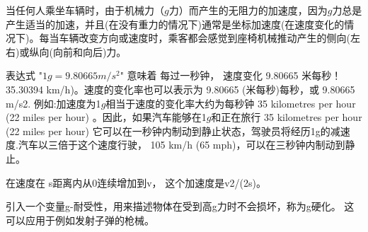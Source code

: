 当任何人乘坐车辆时，由于机械力（$g$力）而产生的无阻力的加速度，因为$g$力总是产生适当的加速，并且(在没有重力的情况下)通常是坐标加速度(在速度变化的情况下)。每当车辆改变方向或速度时，乘客都会感觉到座椅机械推动产生的侧向(左右)或纵向(向前和向后)力。

表达式 "$1 g = 9.80665 m/s^2$" 意味着 每过一秒钟， 速度变化 9.80665 米每秒！35.30394 km/h)。速度的变化率也可以表示为 9.80665 (米每秒)每秒，或 9.80665 m/s2. 例如:加速度为1$g$相当于速度的变化率大约为每秒钟 35 kilometres per hour (22 miles per hour) 。因此，如果汽车能够在1$g$和正在旅行 35 kilometres per hour (22 miles per hour) 它可以在一秒钟内制动到静止状态，驾驶员将经历1g的减速度.汽车以三倍于这个速度行驶， 105 km/h (65 mph)，可以在三秒钟内制动到静止。

在速度在 s距离内从0连续增加到v， 这个加速度是v2/(2s)。

引入一个变量g-耐受性，用来描述物体在受到高g力时不会损坏，称为g硬化。 这可以应用于例如发射子弹的枪械。